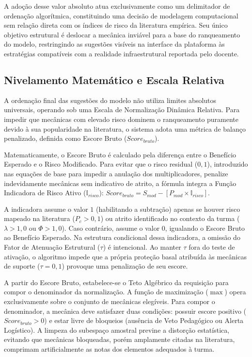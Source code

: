 A adoção desse valor absoluto atua exclusivamente como um delimitador de ordenação algorítmica, constituindo uma decisão de modelagem computacional sem relação direta com os índices de risco da literatura empírica. Seu único objetivo estrutural é deslocar a mecânica inviável para a base do ranqueamento do modelo, restringindo as sugestões visíveis na interface da plataforma às estratégias compatíveis com a realidade infraestrutural reportada pelo docente.



\subsection{Nivelamento Matemático e Escala Relativa}

A ordenação final das sugestões do modelo não utiliza limites absolutos universais, operando sob uma Escala de Normalização Dinâmica Relativa. Para impedir que mecânicas com elevado risco dominem o ranqueamento puramente devido à sua popularidade na literatura, o sistema adota uma métrica de balanço penalizado, definida como Escore Bruto ($Score_{bruto}$).

Matematicamente, o Escore Bruto é calculado pela diferença entre o Benefício Esperado e o Risco Modificado. Para evitar que o risco residual ($0,1$), introduzido nas equações de base para impedir a anulação dos multiplicadores, penalize indevidamente mecânicas sem indicativo de atrito, a fórmula integra a Função Indicadora de Risco Ativo ($\mathbb{I}_{risco}$): 
$Score_{bruto} = S_{mod} - [P_{mod} \times \mathbb{I}_{risco}]$. 

A indicadora assume o valor $1$ (habilitando a subtração) apenas se houver risco mapeado na literatura ($P_c > 0,1$) ou atrito identificado no contexto da turma ($\lambda > 1,0$ ou $\Phi > 1,0$). Caso contrário, assume o valor $0$, igualando o Escore Bruto ao Benefício Esperado. Na estrutura condicional dessa indicadora, a omissão do Fator de Atenuação Estrutural ($\tau$) é intencional. Ao manter $\tau$ fora do teste de ativação, o algoritmo impede que a própria proteção basal atribuída às mecânicas de suporte ($\tau = 0,1$) provoque uma penalização de seu escore.

A partir do Escore Bruto, estabelece-se o Teto Algébrico da requisição para compor o denominador da normalização. A função de maximização ($\max$) opera exclusivamente sobre o conjunto de mecânicas elegíveis. Para compor o denominador, a mecânica deve satisfazer duas condições: possuir escore positivo ($Score_{bruto} > 0$) e estar livre de bloqueios (ausência de Veto Pedagógico ou Alerta Logístico). A limpeza do subespaço amostral previne a distorção estatística, evitando que mecânicas bloqueadas, porém amplamente citadas na literatura, comprimam artificialmente as notas dos elementos adequados à turma.

